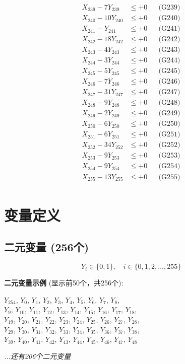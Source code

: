 \documentclass[a4paper,10pt]{article}
\begin{document}
{\begin{align}
X_{239} - 7Y_{239} &\leq +0 && \text{(G239)} \\
X_{240} - 10Y_{240} &\leq +0 && \text{(G240)} \\
X_{241} - Y_{241} &\leq +0 && \text{(G241)} \\
X_{242} - 18Y_{242} &\leq +0 && \text{(G242)} \\
X_{243} - 4Y_{243} &\leq +0 && \text{(G243)} \\
\allowbreak
X_{244} - 3Y_{244} &\leq +0 && \text{(G244)} \\
X_{245} - 5Y_{245} &\leq +0 && \text{(G245)} \\
X_{246} - 7Y_{246} &\leq +0 && \text{(G246)} \\
X_{247} - 31Y_{247} &\leq +0 && \text{(G247)} \\
X_{248} - 9Y_{248} &\leq +0 && \text{(G248)} \\
X_{249} - 2Y_{249} &\leq +0 && \text{(G249)} \\
X_{250} - 6Y_{250} &\leq +0 && \text{(G250)} \\
X_{251} - 6Y_{251} &\leq +0 && \text{(G251)} \\
X_{252} - 34Y_{252} &\leq +0 && \text{(G252)} \\
X_{253} - 9Y_{253} &\leq +0 && \text{(G253)} \\
\allowbreak
X_{254} - 9Y_{254} &\leq +0 && \text{(G254)} \\
X_{255} - 13Y_{255} &\leq +0 && \text{(G255)} \\
\end{align}
}

\section{变量定义}

\subsection{二元变量 (256个)}

\begin{equation}
Y_i \in \{0,1\}, \quad i \in \{0, 1, 2, \ldots, 255\}
\end{equation}

\textbf{二元变量示例} (显示前50个，共256个):

{\small
$Y_{254}$, $Y_{0}$, $Y_{1}$, $Y_{2}$, $Y_{3}$, $Y_{4}$, $Y_{5}$, $Y_{6}$, $Y_{7}$, $Y_{8}$, \\
$Y_{9}$, $Y_{10}$, $Y_{11}$, $Y_{12}$, $Y_{13}$, $Y_{14}$, $Y_{15}$, $Y_{16}$, $Y_{17}$, $Y_{18}$, \\
$Y_{19}$, $Y_{20}$, $Y_{21}$, $Y_{22}$, $Y_{23}$, $Y_{24}$, $Y_{25}$, $Y_{26}$, $Y_{27}$, $Y_{28}$, \\
$Y_{29}$, $Y_{30}$, $Y_{31}$, $Y_{32}$, $Y_{33}$, $Y_{34}$, $Y_{35}$, $Y_{36}$, $Y_{37}$, $Y_{38}$, \\
$Y_{39}$, $Y_{40}$, $Y_{41}$, $Y_{42}$, $Y_{43}$, $Y_{44}$, $Y_{45}$, $Y_{46}$, $Y_{47}$, $Y_{48}$

\textit{...还有206个二元变量}
}
\end{document}
